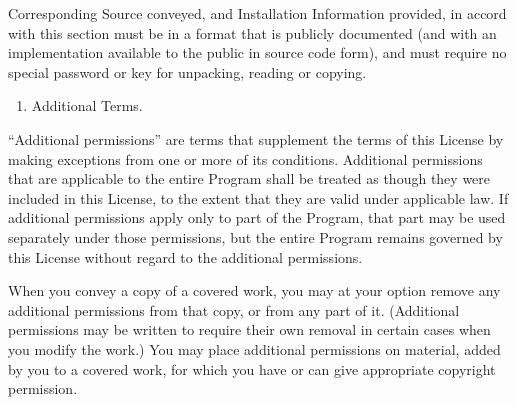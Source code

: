 \documentclass[letterpaper,10pt,english]{sphinxmanual}
\begin{document}
\sphinxAtStartPar
Corresponding Source conveyed, and Installation Information provided, in accord with this section must be in a format that is publicly documented (and with an implementation available to the public in source code form), and must require no special password or key for unpacking, reading or copying.
\begin{enumerate}
%
\setcounter{enumi}{6}
\item {} 
\sphinxAtStartPar
Additional Terms.

\end{enumerate}

\sphinxAtStartPar
“Additional permissions” are terms that supplement the terms of this License by making exceptions from one or more of its conditions. Additional permissions that are applicable to the entire Program shall be treated as though they were included in this License, to the extent that they are valid under applicable law. If additional permissions apply only to part of the Program, that part may be used separately under those permissions, but the entire Program remains governed by this License without regard to the additional permissions.

\sphinxAtStartPar
When you convey a copy of a covered work, you may at your option remove any additional permissions from that copy, or from any part of it. (Additional permissions may be written to require their own removal in certain cases when you modify the work.) You may place additional permissions on material, added by you to a covered work, for which you have or can give appropriate copyright permission.
\end{document}
